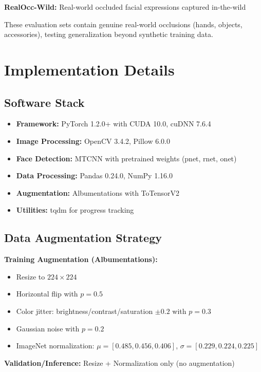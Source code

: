 \documentclass[10pt,twocolumn]{article}
\begin{document}
\textbf{RealOcc-Wild:} Real-world occluded facial expressions captured in-the-wild

These evaluation sets contain genuine real-world occlusions (hands, objects, accessories), testing generalization beyond synthetic training data.

\section{Implementation Details}

\subsection{Software Stack}
\begin{itemize}
    \item \textbf{Framework:} PyTorch 1.2.0+ with CUDA 10.0, cuDNN 7.6.4
    \item \textbf{Image Processing:} OpenCV 3.4.2, Pillow 6.0.0
    \item \textbf{Face Detection:} MTCNN with pretrained weights (pnet, rnet, onet)
    \item \textbf{Data Processing:} Pandas 0.24.0, NumPy 1.16.0
    \item \textbf{Augmentation:} Albumentations with ToTensorV2
    \item \textbf{Utilities:} tqdm for progress tracking
\end{itemize}

\subsection{Data Augmentation Strategy}
\textbf{Training Augmentation (Albumentations):}
\begin{itemize}
    \item Resize to $224 \times 224$
    \item Horizontal flip with $p=0.5$
    \item Color jitter: brightness/contrast/saturation $\pm 0.2$ with $p=0.3$
    \item Gaussian noise with $p=0.2$
    \item ImageNet normalization: $\mu=[0.485, 0.456, 0.406]$, $\sigma=[0.229, 0.224, 0.225]$
\end{itemize}

\textbf{Validation/Inference:} Resize + Normalization only (no augmentation)
\end{document}
